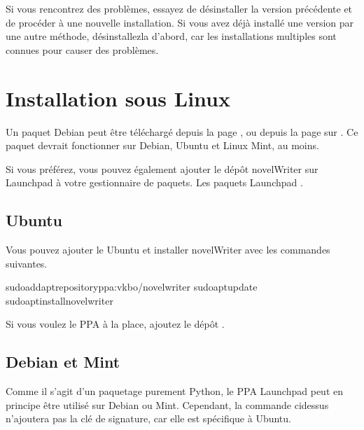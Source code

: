 \documentclass[a4paper,11pt,french]{sphinxmanual}
\begin{document}
\sphinxAtStartPar
Si vous rencontrez des problèmes, essayez de désinstaller la version précédente et de procéder à une nouvelle installation. Si vous avez déjà installé une version par une autre méthode, désinstallez\sphinxhyphen{}la d’abord, car les installations multiples sont connues pour causer des problèmes.


\section{Installation sous Linux}
\label{\detokenize{int_started:installing-on-linux}}\label{\detokenize{int_started:a-started-linux}}
\sphinxAtStartPar
Un paquet Debian peut être téléchargé depuis la page , ou depuis la page  sur . Ce paquet devrait fonctionner sur Debian, Ubuntu et Linux Mint, au moins.

\sphinxAtStartPar
Si vous préférez, vous pouvez également ajouter le dépôt novelWriter sur Launchpad à votre gestionnaire de paquets. Les paquets Launchpad .


\subsection{Ubuntu}
\label{\detokenize{int_started:ubuntu}}
\sphinxAtStartPar
Vous pouvez ajouter le  Ubuntu et installer novelWriter avec les commandes suivantes.

\begin{sphinxVerbatim}[commandchars=\\\{\}]
sudoadd\PYGZhy{}apt\PYGZhy{}repositoryppa:vkbo/novelwriter
sudoaptupdate
sudoaptinstallnovelwriter
\end{sphinxVerbatim}

\sphinxAtStartPar
Si vous voulez le PPA  à la place, ajoutez le dépôt .


\subsection{Debian et Mint}
\label{\detokenize{int_started:debian-and-mint}}
\sphinxAtStartPar
Comme il s’agit d’un paquetage purement Python, le PPA Launchpad peut en principe être utilisé sur Debian ou Mint. Cependant, la commande ci\sphinxhyphen{}dessus n’ajoutera pas la clé de signature, car elle est spécifique à Ubuntu.
\end{document}
